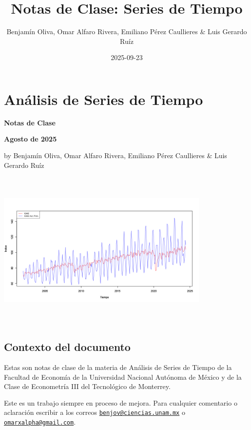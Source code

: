\documentclass[
]{book}
\title{Notas de Clase: Series de Tiempo}
\author{Benjamín Oliva, Omar Alfaro Rivera, Emiliano Pérez Caullieres \& Luis Gerardo Ruíz}
\date{2025-09-23}
\begin{document}
\maketitle

{
\setcounter{tocdepth}{1}
\tableofcontents
}
\hypertarget{anuxe1lisis-de-series-de-tiempo}{%
\chapter*{Análisis de Series de Tiempo}\label{anuxe1lisis-de-series-de-tiempo}}

\textbf{Notas de Clase}

\textbf{Agosto de 2025}

by Benjamín Oliva, Omar Alfaro Rivera, Emiliano Pérez Caullieres \& Luis Gerardo Ruíz

\includegraphics[width=4.16667in,height=3.125in]{Portada.jpg}

\hypertarget{contexto-del-documento}{%
\section*{Contexto del documento}\label{contexto-del-documento}}

Estas son notas de clase de la materia de Análisis de Series de Tiempo de la Facultad de Economía de la Universidad Nacional Autónoma de México y de la Clase de Econometría III del Tecnológico de Monterrey.

Este es un trabajo siempre en proceso de mejora. Para cualquier comentario o aclaración escribir a los correos \href{mailto:benjov@ciencias.unam.mx}{\nolinkurl{benjov@ciencias.unam.mx}} o \href{mailto:omarxalpha@gmail.com}{\nolinkurl{omarxalpha@gmail.com}}.
\end{document}
